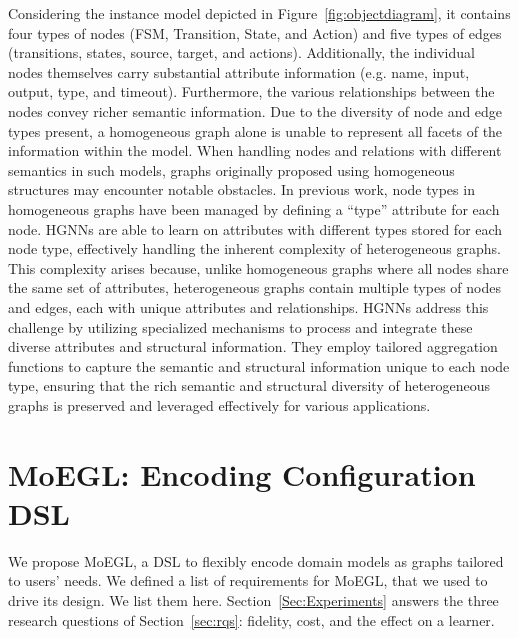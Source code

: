\documentclass[journal,article,submit,moreauthors,technologies]{Definitions/mdpi}
\newcommand{\rev}[1]{#1}
\begin{document}
Considering the instance model depicted in Figure~\ref{fig:objectdiagram}, it contains four types of nodes (FSM, Transition, State, and Action) and five types of edges (transitions, states, source, target, and actions). Additionally, the individual nodes themselves carry substantial attribute information (e.g. name, input, output, type, and timeout). Furthermore, the various relationships between the nodes convey richer semantic information. Due to the diversity of node and edge types present, a homogeneous graph alone is unable to represent all facets of the information within the model. When handling nodes and relations with different semantics in such models, graphs originally proposed using homogeneous structures may encounter notable obstacles. In previous work, node types in homogeneous graphs have been managed by defining a ``type'' attribute for each node. HGNNs are able to learn on attributes with different types stored for each node type, effectively handling the inherent complexity of heterogeneous graphs. This complexity arises because, unlike homogeneous graphs where all nodes share the same set of attributes, heterogeneous graphs contain multiple types of nodes and edges, each with unique attributes and relationships. HGNNs address this challenge by utilizing specialized mechanisms to process and integrate these diverse attributes and structural information. They employ tailored aggregation functions to capture the semantic and structural information unique to each node type, ensuring that the rich semantic and structural diversity of heterogeneous graphs is preserved and leveraged effectively for various applications.

\section{MoEGL: Encoding Configuration DSL} \label{Sec:encodingconfigurationDSL}
We propose MoEGL, a DSL to flexibly encode domain models as graphs tailored to users' needs. We defined a list of requirements for MoEGL, that we used to drive its design. We list them here. \rev{Section~\ref{Sec:Experiments} answers the three research questions of Section~\ref{sec:rqs}: fidelity, cost, and the effect on a learner.}
\end{document}
